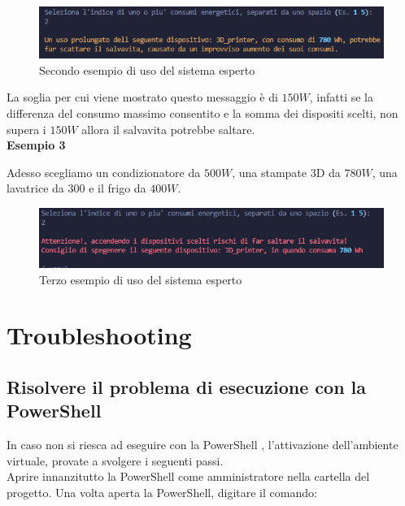 \documentclass[12pt, letterpaper]{article}
\begin{document}
\begin{figure}[h]
      \centering
      \includegraphics[scale=0.70]{sistema-esperto-esempio-2.png}
      \caption{Secondo esempio di uso del sistema esperto}
\end{figure}

\noindent La soglia per cui viene mostrato questo messaggio è di $150W$, infatti se la differenza del
consumo massimo consentito e la somma dei dispositi scelti, non supera i $150W$ allora il salvavita potrebbe
saltare. \\

\noindent \textbf{Esempio 3}

\noindent Adesso scegliamo un condizionatore da $500W$, una stampate 3D da $780W$, una
lavatrice da $300$ e il frigo da $400W$.

\begin{figure}[h]
      \centering
      \includegraphics[scale=0.8]{sistema-esperto-esempio-3.png}
      \caption{Terzo esempio di uso del sistema esperto}
\end{figure}


\section{Troubleshooting}

\subsection{Risolvere il problema di esecuzione con la PowerShell}
\label{sec:powershell-error}

In caso non si riesca ad eseguire con la PowerShell \cite{power-shell-resolution},
l'attivazione dell'ambiente virtuale, provate a svolgere i seguenti passi. \\

\noindent Aprire innanzitutto la PowerShell come amministratore nella cartella del progetto.
Una volta aperta la PowerShell, digitare il comando:
\end{document}
